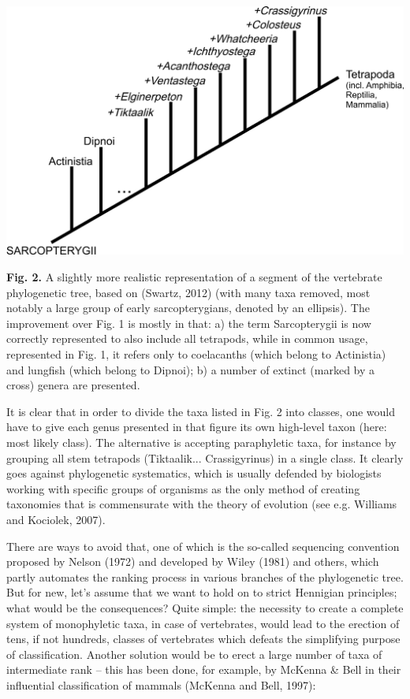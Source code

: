 \documentclass[a4paper]{article}
\begin{document}
{\centering  \includegraphics{Lamzaorg-img002.jpg} \par}
\textbf{Fig. 2.} A slightly more realistic representation of a segment of the vertebrate phylogenetic tree, based on
\label{ref:RNDPuknxVrJnD}(Swartz, 2012) (with many taxa removed, most notably a large group of early sarcopterygians,
denoted by an ellipsis). The improvement over Fig. 1 is mostly in that: a) the term Sarcopterygii is now correctly
represented to also include all tetrapods, while in common usage, represented in Fig. 1, it refers only to coelacanths
(which belong to Actinistia) and lungfish (which belong to Dipnoi); b) a number of extinct (marked by a cross) genera
are presented.

It is clear that in order to divide the taxa listed in Fig. 2 into classes, one would have to give each genus presented
in that figure its own high-level taxon (here: most likely class). The alternative is accepting paraphyletic taxa, for
instance by grouping all stem tetrapods (Tiktaalik... Crassigyrinus) in a single class. It clearly goes against
phylogenetic systematics, which is usually defended by biologists working with specific groups of organisms as the only
method of creating taxonomies that is commensurate with the theory of evolution \label{ref:RNDkC4ruFguZT}(see e.g.
Williams and Kociolek, 2007).

There are ways to avoid that, one of which is the so-called sequencing convention proposed by Nelson
\label{ref:RNDHQubFlpSOG}(1972) and developed by Wiley \label{ref:RNDoeFoXTp1sn}(1981) and others, which partly
automates the ranking process in various branches of the phylogenetic tree. But for new, let’s assume that we want to
hold on to strict Hennigian principles; what would be the consequences? Quite simple: the necessity to create a
complete system of monophyletic taxa, in case of vertebrates, would lead to the erection of tens, if not hundreds,
classes of vertebrates which defeats the simplifying purpose of classification. Another solution would be to erect a
large number of taxa of intermediate rank – this has been done, for example, by McKenna \& Bell in their influential
classification of mammals \label{ref:RNDTh5Uw8JZAm}(McKenna and Bell, 1997):
\end{document}
